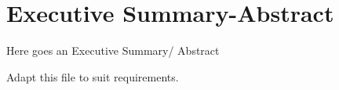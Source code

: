 \section*{Executive Summary-Abstract}
Here goes an Executive Summary/ Abstract

Adapt this file to suit requirements.
\clearpage
